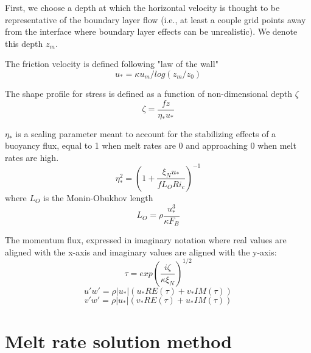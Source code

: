 \documentclass[letterpaper,10pt]{report}
\begin{document}
    First, we choose a depth at which the horizontal velocity is thought to be representative of the boundary layer flow (i.e., at least a couple grid points away from the interface where boundary layer effects can be unrealistic). We denote this depth $z_m$. 
    
    The friction velocity is defined following "law of the wall"
    \begin{equation}
        u_* = \kappa u_m / log(z_m/z_0)
    \end{equation}
    
    The shape profile for stress is defined as a function of non-dimensional depth $\zeta$
    \begin{equation}
        \zeta = \frac{f z}{\eta_* u_*}
    \end{equation}
    
    $\eta_*$ is a scaling parameter meant to account for the stabilizing effects of a buoyancy flux, equal to 1 when melt rates are 0 and approaching 0 when melt rates are high.
    \begin{equation}
        \eta_*^2 = (1+\frac{\xi_N u_*}{f L_O Ri_c})^{-1}
    \end{equation}
    where $L_O$ is the Monin-Obukhov length
    \begin{equation}
        L_O = \rho \frac{u_*^3}{\kappa F_{B}}
    \end{equation}
    
    The momentum flux, expressed in imaginary notation where real values are aligned with the x-axis and imaginary values are aligned with the y-axis:
    \begin{equation}
        \tau = exp(\frac{i \zeta}{\kappa \xi_N})^{1/2}
    \end{equation}
    \begin{equation}
        u'w' = \rho |u_*| (u_* RE(\tau) + v_* IM(\tau))
    \end{equation}
    \begin{equation}
        v'w' = \rho |u_*|(v_* RE(\tau) + u_* IM(\tau))
    \end{equation}
    
    \section{Melt rate solution method}
	
\end{document}

